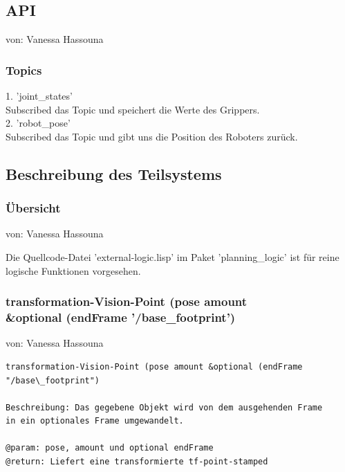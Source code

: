 \documentclass{suturo}
\makeatletter
\newcommand{\chapterauthor}[1]{%
  {\parindent0pt\vspace*{-27pt}%
  \linespread{0}\small\begin{flushright}von: #1\end{flushright}%
  \par\nobreak\vspace*{0pt}}
  \@afterheading%
}
\makeatother
\begin{document}
\begin{figure}[!htb]
\end{figure}


\subsection{API}
\chapterauthor{Vanessa Hassouna}
\subsubsection{Topics}
1. 'joint\_states' \\
Subscribed das Topic und speichert die Werte des Grippers.\\
 
2. 'robot\_pose' \\
Subscribed das Topic und gibt uns die Position des Roboters zurück.
\subsection{Beschreibung des Teilsystems}

\subsubsection{\"Ubersicht}
\chapterauthor{Vanessa Hassouna}
Die Quellcode-Datei 'external-logic.lisp' im Paket 'planning\_logic' ist für reine logische Funktionen vorgesehen.



\subsubsection{transformation-Vision-Point (pose amount\\
\&optional (endFrame '/base\_footprint')}
\chapterauthor{Vanessa Hassouna}
\begin{verbatim}
transformation-Vision-Point (pose amount &optional (endFrame "/base\_footprint")

Beschreibung: Das gegebene Objekt wird von dem ausgehenden Frame
in ein optionales Frame umgewandelt.

@param: pose, amount und optional endFrame
@return: Liefert eine transformierte tf-point-stamped
\end{verbatim}
\end{document}
